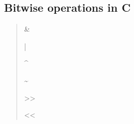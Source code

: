 
\subsection{Bitwise operations in C}

\begin{quote}
\&

|

\textasciicircum

\textasciitilde

>>

<<

\end{quote}

